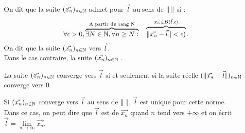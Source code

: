 \documentclass{book}
\begin{document}
\begin{Definition}
On dit que la suite $(\vec{x_n})_{n\in\mathbb{N}}$ admet pour  $\vec{l}$ au sens de $\mathopen\lVert \, \mathclose\rVert$ si :
$$\forall  \epsilon > 0,\overbrace{\exists N \in \mathbb{N}, \forall n\geq N :}^{\text{A partir du rang N}}\quad\overbrace{ \mathopen\lVert \vec{x_n} - \vec{l} \mathclose\rVert< \epsilon)}^{x_n\in B(\vec{l},\epsilon)}.$$
On dit que la suite $(\vec{x_n})_{n\in\mathbb{N}}$  vers  $\vec{l}$.\\ 
Dans le cas contraire, la suite $(\vec{x_n})_{n\in\mathbb{N}}$ .\\
\end{Definition}
\begin{Proposition}
La suite $(\vec{x_n})_{n\in\mathbb{N}}$ converge vers  $\vec{l}$ si et seulement si la suite réelle $(\mathopen\lVert \vec{x_n}-\vec{l} \mathclose\rVert)_{n\in\mathbb{N}}$ converge vers 0.
\end{Proposition}
\begin{DefinitionProposition}
Si $(\vec{x_n})_{n\in\mathbb{N}}$ converge vers $\vec{l}$ au sens de $\mathopen\lVert \, \mathclose\rVert$, $\vec{l}$ est unique pour cette norme.\\
Dans ce cas, on peut dire que $\vec{l}$ est  de $\vec{x_n}$ quand $n$ tend vers $+\infty$ et
on écrit  $\vec{l}=\lim\limits_{n\to\infty}\vec{x_n}$.
\end{DefinitionProposition}
\end{document}
